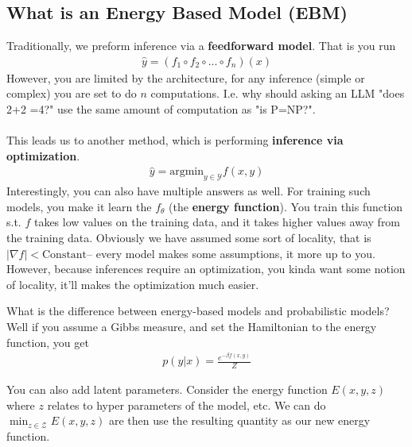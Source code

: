 \begin{itemize}
\subsection{What is an Energy Based Model (EBM)}
Traditionally, we preform inference via a \textbf{feedforward model}. That is you run
\begin{align}
	\hat y  = (f_1 \circ f_2 \circ ... \circ f_n )(x)
\end{align}
However, you are limited by the architecture, for any inference (simple or complex) you are set to do $n$ computations. I.e. why should asking an LLM "does 2+2 =4?" use the same amount of computation as "is P=NP?". 
\\
\\
This leads us to another method, which is performing \textbf{inference via optimization}.
\begin{align}
	\hat y = \text{argmin}_{y \in \mathcal Y} f(x,y)
\end{align}
Interestingly, you can also have multiple answers as well. For training such models, you make it learn the $f_\theta$ (the \textbf{energy function}). You train this function s.t. $f$ takes low values on the training data, and it takes higher values away from the training data. Obviously we have assumed some sort of locality, that is $|\nabla f| <  \text{Constant}$-- every model makes some assumptions, it more up to you. However, because inferences require an optimization, you kinda want some notion of locality, it'll makes the optimization much easier.
\begin{sidework}
	What is the difference between energy-based models and probabilistic models? Well if you assume a Gibbs measure, and set the Hamiltonian to the energy function, you get
	\begin{align}
		p(y |x) = \frac{e^{- \beta f(x,y)}}{Z}
	\end{align}
\end{sidework}
You can also add latent parameters. Consider the energy function $E(x,y,z)$ where $z$ relates to hyper parameters of the model, etc. We can do $\min_{z\in \mathcal Z} E(x,y,z)$ are then use the resulting quantity as our new energy function.


\end{itemize}
